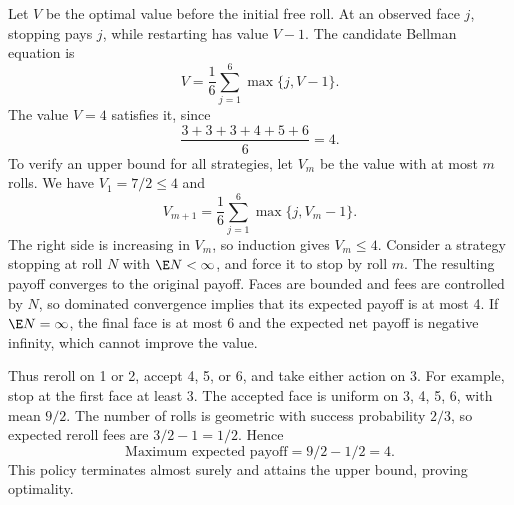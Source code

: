 Let $V$ be the optimal value before the initial free roll. At an observed face $j$, stopping pays $j$, while restarting has value $V-1$. The candidate Bellman equation is
\[
 V=\frac16\sum_{j=1}^6\max\{j,V-1\}.
\]
The value $V=4$ satisfies it, since
\[
 \frac{3+3+3+4+5+6}{6}=4.
\]
To verify an upper bound for all strategies, let $V_m$ be the value with at most $m$ rolls. We have $V_1=7/2\le4$ and
\[
 V_{m+1}=\frac16\sum_{j=1}^6\max\{j,V_m-1\}.
\]
The right side is increasing in $V_m$, so induction gives $V_m\le4$. Consider a strategy stopping at roll $N$ with $\E N<\infty$, and force it to stop by roll $m$. The resulting payoff converges to the original payoff. Faces are bounded and fees are controlled by $N$, so dominated convergence implies that its expected payoff is at most 4. If $\E N=\infty$, the final face is at most 6 and the expected net payoff is negative infinity, which cannot improve the value.

Thus reroll on 1 or 2, accept 4, 5, or 6, and take either action on 3. For example, stop at the first face at least 3. The accepted face is uniform on 3, 4, 5, 6, with mean $9/2$. The number of rolls is geometric with success probability $2/3$, so expected reroll fees are $3/2-1=1/2$. Hence
\[
 \boxed{\text{Maximum expected payoff}=9/2-1/2=4}.
\]
This policy terminates almost surely and attains the upper bound, proving optimality.
